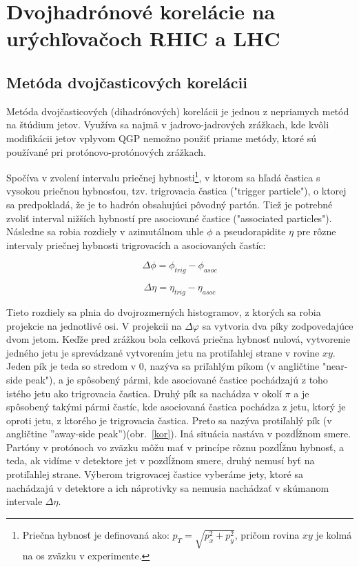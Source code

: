 \documentclass[thesismargins, thesislinespacing]{rnthesis}
\begin{document}
\chapter{Dvojhadrónové korelácie na urýchľovačoch RHIC a LHC}

\section{Metóda dvojčasticových korelácii}
\label{korel}
Metóda dvojčasticových (dihadrónových) korelácii je jednou z nepriamych metód na štúdium jetov. Využíva sa najmä v jadrovo-jadrových zrážkach, kde kvôli \-mo\-di\-fi\-ká\-cii jetov vplyvom QGP nemožno použiť priame metódy, ktoré sú používané pri protónovo-protónových zrážkach.

Spočíva v zvolení intervalu priečnej hybnosti\footnote{Priečna hybnosť je definovaná ako: $p_T=\sqrt{p_x^2+p_y^2}$, pričom rovina $xy$ je kolmá na os zväzku v experimente.}, v ktorom sa hľadá častica s vysokou priečnou hybnosťou, tzv. trigrovacia častica ("trigger particle"), o ktorej sa predpokladá, že je to hadrón obsahujúci pôvodný partón. Tiež je potrebné zvoliť interval nižších hybností pre asociované častice ("\-associated particles"). Následne sa robia rozdiely v \-a\-zi\-mu\-tál\-nom uhle $\phi$ a pseudorapidite $\eta$ pre rôzne intervaly priečnej hybnosti trigrovacích a asociovaných častíc:

\begin{equation}
\Delta \phi = \phi_{trig} - \phi_{asoc}
\end{equation}

\begin{equation}
\Delta \eta = \eta_{trig} - \eta_{asoc}
\end{equation}

Tieto rozdiely sa plnia do dvojrozmerných histogramov, z ktorých sa robia projekcie na jednotlivé osi. V projekcii na $\Delta \varphi$ sa vytvoria dva píky zodpovedajúce dvom jetom. Keďže pred zrážkou bola celková priečna hybnosť nulová, vytvorenie jedného jetu je sprevádzané vytvorením jetu na protiľahlej strane v rovine $xy$. Jeden pík je teda so stredom v 0, nazýva sa priľahlým píkom (v angličtine "near-side peak"), a je spôsobený pármi, kde asociované častice pochádzajú z toho istého jetu ako trigrovacia častica. Druhý pík sa nachádza v okolí $\pi$ a je spôsobený takými pármi častíc, kde asociovaná častica pochádza z jetu, ktorý je oproti jetu, z ktorého je trigrovacia častica. Preto sa nazýva protiľahlý pík (v angličtine ''away-side peak'')(obr.~\ref{kor}). Iná situácia nastáva v pozdĺžnom smere. Partóny v protónoch vo zväzku môžu mať v princípe rôznu pozdĺžnu hybnosť, a teda, ak vidíme v detektore jet v pozdĺžnom smere, druhý nemusí byť na protiľahlej strane. Výberom trigrovacej častice vyberáme jety, ktoré sa nachádzajú v detektore a ich náprotivky sa nemusia nachádzať v skúmanom intervale $\Delta \eta$.
\end{document}
